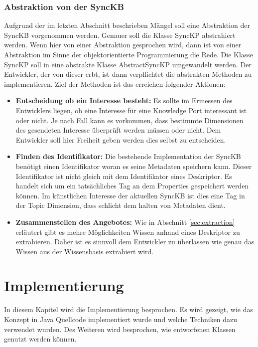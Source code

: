 \documentclass[a4paper]{article}
\begin{document}
	\subsubsection{Abstraktion von der SyncKB}
	
	Aufgrund der im letzten Abschnitt beschrieben Mängel soll eine Abstraktion der
	SyncKB vorgenommen werden. Genauer soll die Klasse SyncKP abstrahiert werden.
	Wenn hier von einer Abstraktion gesprochen wird, dann ist von einer Abstraktion 
	im Sinne der objektorientierte Programmierung die Rede. Die Klasse SyncKP soll in
	eine abstrakte Klasse AbstractSyncKP umgewandelt werden. Der Entwickler, der
	von dieser erbt, ist dann verpflichtet die abstrakten Methoden 
	zu implementieren. Ziel der Methoden ist das erreichen folgender Aktionen:
	
	\begin{itemize}
		\item \textbf{Entscheidung ob ein Interesse besteht:} Es sollte im 
		Ermessen des Entwicklers liegen, ob eine Interesse
		für eine Knowledge Port interessant ist oder nicht. Je nach Fall kann
		es vorkommen, dass bestimmte Dimensionen des gesendeten Interesse überprüft
		werden müssen oder nicht. Dem Entwickler soll hier Freiheit geben werden
		dies selbst zu entscheiden.
		\item \textbf{Finden des Identifikator:} Die bestehende Implementation der
		SyncKB benötigt einen Identifikator woran es seine Metadaten speichern
		kann. Dieser Identifikator ist nicht gleich mit dem Identifikator eines
		Deskriptor. Es handelt sich um ein tatsächliches Tag an dem Properties
		gespeichert werden können. Im künstlichen Interesse der aktuellen SyncKB
		ist dies eine Tag in der Topic Dimension, dass schlicht dem halten von
		Metadaten dient.
		\item \textbf{Zusammenstellen des Angebotes:} Wie in Abschnitt
		\ref{sec:extraction} erläutert gibt es mehre Möglichkeiten Wissen
		anhand eines Deskriptor zu extrahieren. Daher ist es sinnvoll dem
		Entwickler zu überlassen wie genau das Wissen aus der Wissensbasis
		extrahiert wird. 
	\end{itemize} 	
	
	\newpage
	\section{Implementierung}
	
	In diesem Kapitel wird die Implementierung besprochen. Es wird gezeigt, wie
	das Konzept in Java Quellcode implementiert wurde und welche Techniken dazu
	verwendet wurden. Des Weiteren wird besprochen, wie entworfenen Klassen 
	genutzt werden können.
	
\end{document}
